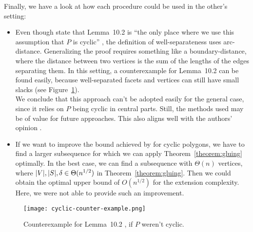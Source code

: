Finally, we have a look at how each procedure could be used in the other's setting:

\begin{itemize}
  \item Even though \citeauthor{kwan2020extension} state that Lemma~10.2 is ``the only place where we use this assumption that $P$ is cyclic'' \cite[22]{kwan2020extension}, the definition of well-separateness uses arc-distance. Generalizing the proof requires something like a boundary-distance, where the distance between two vertices is the sum of the lengths of the edges separating them. In this setting, a counterexample for Lemma~10.2 can be found easily, because well-separated facets and vertices can still have small slacks (see Figure~\ref{fig:cyclic-counter-example}).\\
        We conclude that this approach can't be adopted easily for the general case, since it relies on $P$ being cyclic in central parts. Still, the methods used may be of value for future approaches. This also aligns well with the authors' opinion \cite[28]{kwan2020extension}.
  \item If we want to improve the bound achieved by \citeauthor{shitov2020sublinear} for cyclic polygons, we have to find a larger subsequence for which we can apply Theorem~\ref{theorem:gluing} optimally. In the best case, we can find a subsequence with $\Theta(n)$ vertices, where $\lvert V\rvert,\lvert S\rvert,\delta \in \Theta(n^{1/2})$ in Theorem~\ref{theorem:gluing}. Then we could obtain the optimal upper bound of $O(n^{1/2})$ for the extension complexity.\\
        Here, we were not able to provide such an improvement.
\end{itemize}

\begin{figure}[ht]
  \centering
  \texttt{[image: cyclic-counter-example.png]}
  \caption{Counterexample for Lemma~10.2 \cite{kwan2020extension}, if $P$ weren't cyclic.}
  \label{fig:cyclic-counter-example}
\end{figure}
